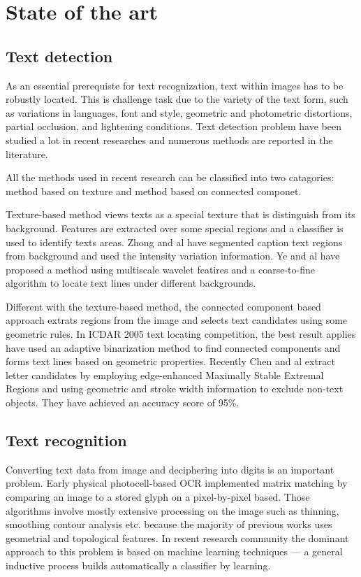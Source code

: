 \documentclass[paper=a4, french, 11pt]{scrartcl}
\begin{document}
\section{State of the art}
\subsection{Text detection}
As an essential prerequiste for text recognization, text within images has to be robustly located. This is challenge task due to the variety of the text form, such as variations in languages, font and style, geometric and photometric distortions, partial occlusion, and lightening conditions. Text detection problem have been studied a lot in recent researches and numerous methods are reported in the literature.

All the methods used in recent research can be classified into two catagories: method based on texture and method based on connected componet.

Texture-based method views texts as a special texture that is distinguish from its background. Features are extracted over some special regions and a classifier is used to identify texts areas. Zhong and al have segmented caption text regions from background and used the intensity variation information. Ye and al have proposed a method using multiscale wavelet featires and a coarse-to-fine algorithm to locate text lines under different backgrounds.

Different with the texture-based method, the connected component based approach extrats regions from the image and selects text candidates using some geometric rules. In ICDAR 2005 text locating competition, the best result applies have used an adaptive binarization method to find connected components and forms text lines based on geometric properties. Recently Chen and al extract letter candidates by employing edge-enhanced Maximally Stable Extremal Regions and using geometric and stroke width information to exclude non-text objects. They have achieved an accuracy score of 95\%.

\subsection{Text recognition}
Converting text data from image and deciphering into digits is an important problem. Early physical photocell-based OCR implemented matrix matching by comparing an image to a stored glyph on a pixel-by-pixel based. Those algorithms involve mostly extensive processing on the image such as thinning, smoothing contour analysis etc. because the majority of previous works uses geometrial and topological features. In recent research community the dominant approach to this problem is based on machine learning techniques --- a general inductive process builds automatically a classifier by learning.
\end{document}
